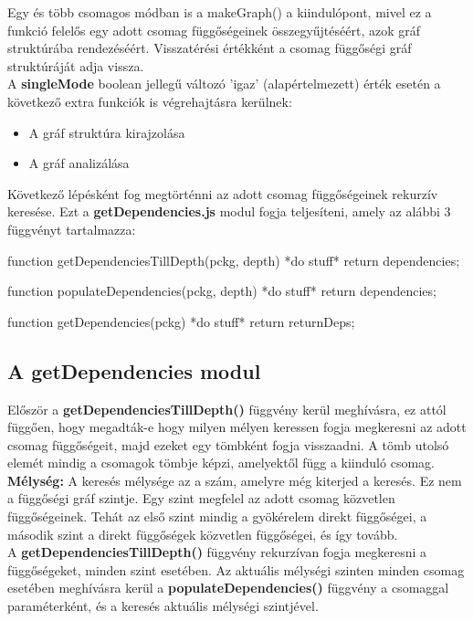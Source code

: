 Egy és több csomagos módban is a makeGraph() a kiindulópont, mivel ez a funkció felelős egy adott csomag függőségeinek összegyűjtéséért, azok gráf struktúrába rendezéséért.
Visszatérési értékként a csomag függőségi gráf struktúráját adja vissza.\\

A \textbf{singleMode} boolean jellegű változó 'igaz' (alapértelmezett) érték esetén a következő extra funkciók is végrehajtásra kerülnek:
	\begin{itemize}
		\item A gráf struktúra kirajzolása
		\item A gráf analizálása
	\end{itemize}

Következő lépésként fog megtörténni az adott csomag függőségeinek rekurzív keresése. Ezt a \textbf{getDependencies.js} modul fogja teljesíteni, amely az alábbi 3 függvényt tartalmazza:

\begin{cpp}
function getDependenciesTillDepth(pckg, depth){
	*do stuff*
	return dependencies;
}

function populateDependencies(pckg, depth){
	*do stuff*
	return dependencies;
}

function getDependencies(pckg){
	*do stuff*
	return returnDeps;
}
\end{cpp}

\subsection{A getDependencies modul}

Először a \textbf{getDependenciesTillDepth()} függvény kerül meghívásra, ez attól függően, hogy megadták-e hogy milyen mélyen keressen fogja megkeresni az adott csomag függőségeit, majd ezeket egy tömbként fogja visszaadni. A tömb utolsó elemét mindig a csomagok tömbje képzi, amelyektől függ a kiinduló csomag.\\

\textbf{Mélység: }A keresés mélysége az a szám, amelyre még kiterjed a keresés. Ez nem a függőségi gráf szintje. Egy szint megfelel az adott csomag közvetlen függőségeinek. Tehát az első szint mindig a gyökérelem direkt függőségei, a második szint a direkt függőségek közvetlen függőségei, és így tovább.\\

A \textbf{getDependenciesTillDepth()} függvény rekurzívan fogja megkeresni a függőségeket, minden szint esetében. Az aktuális mélységi szinten minden csomag esetében meghívásra kerül a \textbf{populateDependencies()} függvény a csomaggal paraméterként, és a keresés aktuális mélységi szintjével.

